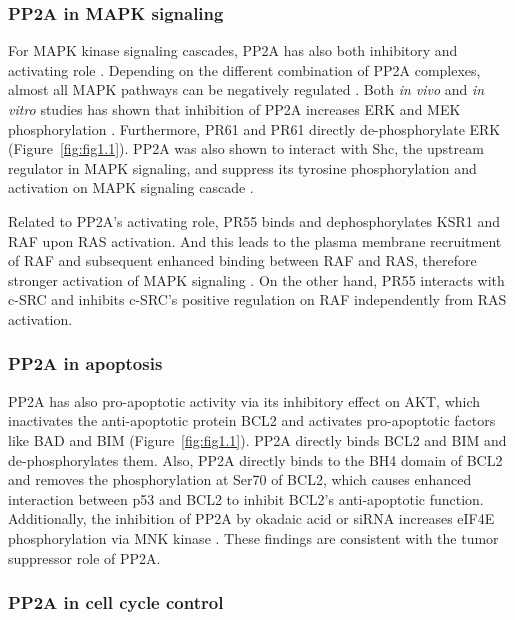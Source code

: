 \subsubsection{PP2A in MAPK signaling}

For MAPK kinase signaling cascades, PP2A has also both inhibitory and activating role \cite{eichhorn_protein_2009}. Depending on the different combination of PP2A complexes, almost all MAPK pathways can be negatively regulated \cite{junttila_phosphatase-mediated_2008}. Both \textit{in vivo} and \textit{in vitro} studies has shown that inhibition of PP2A increases ERK and MEK phosphorylation \cite{junttila_phosphatase-mediated_2008}. Furthermore, PR61\textbeta{} and PR61\textgamma{} directly de-phosphorylate ERK \cite{eichhorn_protein_2009} (Figure~\ref{fig:fig1.1}). PP2A was also shown to interact with Shc, the upstream regulator in MAPK signaling, and suppress its tyrosine phosphorylation and activation on MAPK signaling cascade \cite{junttila_phosphatase-mediated_2008}. 

Related to PP2A's activating role, PR55\textalpha{} binds and dephosphorylates KSR1 and RAF upon RAS activation. And this leads to the plasma membrane recruitment of RAF and subsequent enhanced binding between RAF and RAS, therefore stronger activation of MAPK signaling \cite{eichhorn_protein_2009}. On the other hand, PR55\textgamma{} interacts with c-SRC and inhibits c-SRC's positive regulation on RAF independently from RAS activation. 


\subsubsection{PP2A in apoptosis}

PP2A has also pro-apoptotic activity via its inhibitory effect on AKT, which inactivates the anti-apoptotic protein BCL2 and activates pro-apoptotic factors like BAD and BIM \cite{eichhorn_protein_2009,janssens_role_2012} (Figure~\ref{fig:fig1.1}). PP2A directly binds BCL2 and BIM and de-phosphorylates them. Also, PP2A directly binds to the BH4 domain of BCL2 and removes the phosphorylation at Ser70 of BCL2, which causes enhanced interaction between p53 and BCL2 to inhibit BCL2's anti-apoptotic function. Additionally, the inhibition of PP2A by okadaic acid or siRNA increases eIF4E phosphorylation via MNK kinase \cite{li_protein_2010}. These findings are consistent with the tumor suppressor role of PP2A.


\subsubsection{PP2A in cell cycle control}

